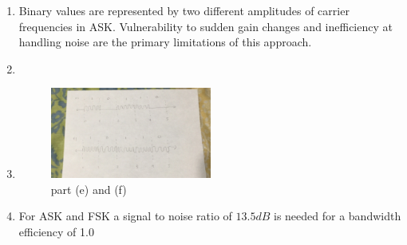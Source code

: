 \documentclass[11pt]{article}
\begin{document}
\begin{enumerate}[label=(\alph*)]
\item {
	Binary values are represented by two different amplitudes of carrier frequencies in ASK. Vulnerability to sudden gain changes and 
	inefficiency at handling noise are the primary limitations of this approach.
}

\item {} 
\item {} 

\begin{figure}[h] %
\centering
\includegraphics[width=0.5\textwidth]{1ef}
\caption{part (e) and (f)}
\end{figure}

\item {
	For ASK and FSK a signal to noise ratio of $13.5dB$ is needed for a bandwidth efficiency of 1.0
}
\end{enumerate}
 
\end{document}
